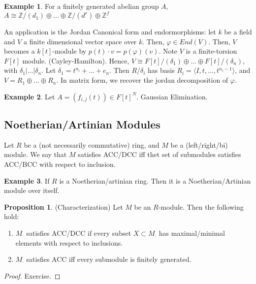 \documentclass{article}
\theoremstyle{definition}
\theoremstyle{definition}
\theoremstyle{definition}
\newtheorem{proposition}{Proposition}[section]
\theoremstyle{definition}
\theoremstyle{definition}
\theoremstyle{definition}
\theoremstyle{definition}
\newtheorem{example}{Example}[section]
\begin{document}
\begin{tcolorbox}[colback=yellow!5!white,colframe=yellow!30!white]
\begin{example}
For a finitely generated abelian group $A$, $A\cong \mathbb{Z}/(d_1)\oplus...\oplus \mathbb{Z}/(d^r)\oplus \mathbb{Z}^f$
\end{example}
\end{tcolorbox}

An application is the Jordan Canonical form and endormorphisms: let $k$ be a field and $V$ a finite dimensional vector space over $k$. Then, $\varphi\in End(V)$. Then, $V$ becomes a $k[t]$-module by $p(t)\cdot v=p(\varphi)(v)$. Note $V$ is a finite-torsion $F[t]$ module. (Cayley-Hamilton). Hence, $V\cong F[t]/(\delta_1)\oplus...\oplus F[t]/(\delta_n)$, with $\delta_1|...|\delta_n$. Let $\delta_1=t^{n_i}+...+e_{n}$. Then $R/\delta_i$ has basis $R_i=\langle I,t,...,t^{n_i-1}\rangle $, and $V=R_1\oplus ...\oplus R_n$. In matrix form, we recover the jordan decomposition of $\varphi$. 



\begin{tcolorbox}[colback=yellow!5!white,colframe=yellow!30!white]
\begin{example}
Let $A=(f_{i,j}(t))\in F[t]^N$. Gaussian Elimination. 
\end{example}
\end{tcolorbox}

\subsection{Noetherian/Artinian Modules}
Let $R$ be a (not necessarily commutative) ring, and $M$ be a (left/right/bi) module. We say that $M$ satisfies ACC/DCC iff thet set of submodules satisfies ACC/BCC with respect to inclusion.


\begin{tcolorbox}[colback=yellow!5!white,colframe=yellow!30!white]
\begin{example}
If $R$ is a Noetherian/artinian ring. Then it is a Noetherian/Artinian module over itself. 
\end{example}
\end{tcolorbox}


\begin{tcolorbox}[colback=blue!5!white,colframe=blue!30!white]
\begin{proposition}
(Characterization) Let $M$ be an $R$-module. Then the following hold: 
\begin{enumerate}
    \item $M_{\cdot}$ satisfies ACC/DCC if every subset $X\subset M_{\cdot}$ has maximal/minimal elements with respect to inclusions.
    \item $M_{\cdot}$ satisfies ACC iff every submodule is finitely generated. 
\end{enumerate}
\end{proposition}
\end{tcolorbox}
\begin{proof}
    Exercise. 
\end{proof}
\end{document}
